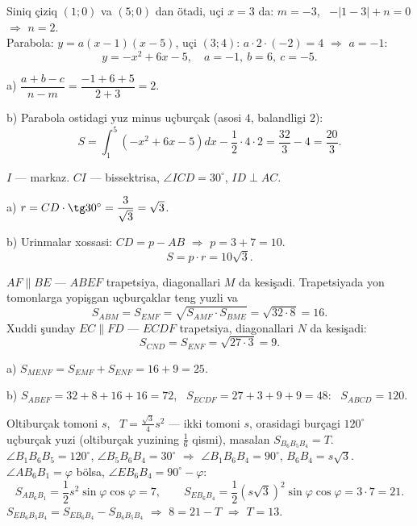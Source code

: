 \newpage
{}
Siniq çiziq $(1;0)$ va $(5;0)$ dan ötadi, uçi $x=3$ da: $m=-3$, \ $-|1-3|+n=0$ $\Rightarrow$ $n=2$.\\
Parabola: $y=a(x-1)(x-5)$, uçi $(3;4)$: $a\cdot2\cdot(-2)=4$ $\Rightarrow$ $a=-1$:
\[y=-x^2+6x-5,\quad a=-1,\ b=6,\ c=-5.\]

a) $\dfrac{a+b-c}{n-m}=\dfrac{-1+6+5}{2+3}=2$.

b) Parabola ostidagi yuz minus uçburçak (asosi $4$, balandligi $2$):
\[S=\int_1^5\left(-x^2+6x-5\right)dx-\frac12\cdot4\cdot2=\frac{32}3-4=\frac{20}3.\]

\newpage
{}
$I$ — markaz. $CI$ — bissektrisa, $\angle ICD=30^\circ$, $ID\perp AC$.

a) $r=CD\cdot\tg30^\circ=\dfrac3{\sqrt3}=\sqrt3$.

b) Urinmalar xossasi: $CD=p-AB$ $\Rightarrow$ $p=3+7=10$.
\[S=p\cdot r=10\sqrt3.\]

\newpage
{}
$AF\parallel BE$ — $ABEF$ trapetsiya, diagonallari $M$ da kesişadi. Trapetsiyada yon tomonlarga yopişgan uçburçaklar teng yuzli va
\[S_{ABM}=S_{EMF}=\sqrt{S_{AMF}\cdot S_{BME}}=\sqrt{32\cdot8}=16.\]
Xuddi şunday $EC\parallel FD$ — $ECDF$ trapetsiya, diagonallari $N$ da kesişadi:
\[S_{CND}=S_{ENF}=\sqrt{27\cdot3}=9.\]

a) $S_{MENF}=S_{EMF}+S_{ENF}=16+9=25$.

b) $S_{ABEF}=32+8+16+16=72$, \ $S_{ECDF}=27+3+9+9=48$: \ $S_{ABCD}=120$.

\newpage
{}
Oltiburçak tomoni $s$, \ $T=\frac{\sqrt3}4s^2$ — ikki tomoni $s$, orasidagi burçagi $120^\circ$ uçburçak yuzi (oltiburçak yuzining $\frac16$ qismi), masalan $S_{B_6B_5B_4}=T$.\\
$\angle B_1B_6B_5=120^\circ$, $\angle B_5B_6B_4=30^\circ$ $\Rightarrow$ $\angle B_1B_6B_4=90^\circ$, $B_6B_4=s\sqrt3$.\\
$\angle AB_6B_1=\varphi$ bölsa, $\angle EB_6B_4=90^\circ-\varphi$:
\[S_{AB_6B_1}=\frac12s^2\sin\varphi\cos\varphi=7,\qquad S_{EB_6B_4}=\frac12\left(s\sqrt3\right)^2\sin\varphi\cos\varphi=3\cdot7=21.\]
$S_{EB_6B_5B_4}=S_{EB_6B_4}-S_{B_6B_5B_4}$ $\Rightarrow$ $8=21-T$ $\Rightarrow$ $T=13$.

